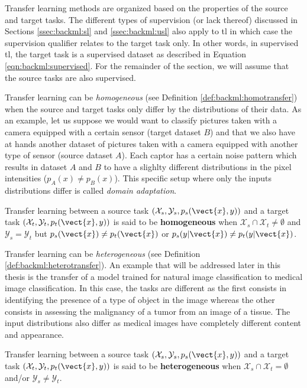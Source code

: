 Transfer learning methods are organized based on the properties of the source and
target tasks. The different types of supervision (or lack thereof) discussed in
Sections \ref{ssec:backml:sl} and \ref{ssec:backml:usl} also apply to \acrlong{tl} in which case
the supervision qualifier relates to the target task only. In other words, in
supervised \acrlong{tl}, the target task is a supervised dataset as described in
Equation \ref{eqn:backml:supervised}. For the remainder of the section, we will
assume that the source tasks are also supervised.

Transfer learning can be \textit{homogeneous} (see Definition \ref{def:backml:homotransfer})
when the source and target tasks only differ by the distributions of their data.
As an example, let us suppose we would want to classify pictures taken with a camera
equipped with a certain sensor (target dataset $B$) and that we also have at hands
another dataset of pictures taken with a camera equipped with another type of
sensor (source dataset $A$). Each captor has a certain noise pattern which results
in dataset $A$ and $B$ to have a slighlty different distributions in the pixel
intensities (\ie $p_A(x) \neq p_B(x)$). This specific setup where only the inputs
distributions differ is called \textit{domain adaptation}.

\begin{definition}
\label{def:backml:homotransfer}
Transfer learning between a source task $\left(\mathcal{X}_{s}, \mathcal{Y}_{s}, p_{s}(\vect{x}, y)\right)$ and a target task $\left(\mathcal{X}_t, \mathcal{Y}_t, p_t(\vect{x}, y)\right)$ is said to be \textbf{homogeneous} when $\mathcal{X}_s \cap \mathcal{X}_t \neq \emptyset$ and $\mathcal{Y}_s = \mathcal{Y}_t$ but $p_s(\vect{x}) \neq p_t(\vect{x})$ or $p_s(y|\vect{x}) \neq p_t(y|\vect{x})$.
\end{definition}

Transfer learning can be \textit{heterogeneous} (see Definition
\ref{def:backml:heterotransfer}). An example that will be addressed later in this
thesis is the transfer of a model trained for natural image classification to
medical image classification. In this case, the tasks are different as the first
consists in identifying the presence of a type of object in the image whereas the
other consists in assessing the malignancy of a tumor from an image of a tissue.
The input distributions also differ as medical images have completely different
content and appearance.

\begin{definition}
\label{def:backml:heterotransfer}
Transfer learning between a source task $\left(\mathcal{X}_{s}, \mathcal{Y}_{s}, p_{s}(\vect{x}, y)\right)$ and a target task $\left(\mathcal{X}_t, \mathcal{Y}_t, p_t(\vect{x}, y)\right)$ is said to be \textbf{heterogeneous} when $\mathcal{X}_s \cap \mathcal{X}_t = \emptyset$ and/or $\mathcal{Y}_s \neq \mathcal{Y}_t$.
\end{definition}

